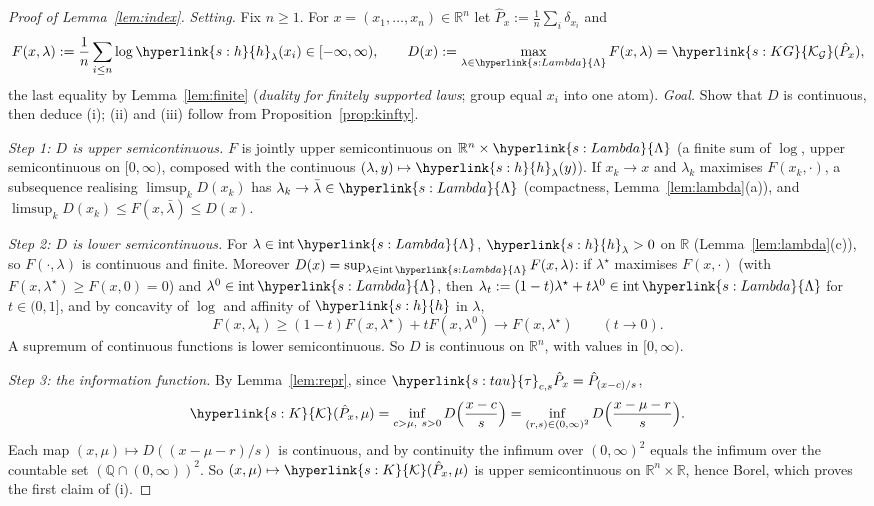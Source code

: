 \documentclass[11pt]{article}
\newcommand{\R}{\mathbb{R}}
\newcommand{\sy}[2]{{\hyperlink{#1}{#2}}}
\newcommand{\Kc}{\sy{s:K}{\mathcal{K}}}
\newcommand{\KG}{\sy{s:KG}{\mathcal{K}_{\mathcal{G}}}}
\newcommand{\tauc}{\sy{s:tau}{\tau}}
\newcommand{\hl}{\sy{s:h}{h}}
\newcommand{\Lam}{\sy{s:Lambda}{\Lambda}}
\begin{document}
\begin{proof}[Proof of Lemma~\ref{lem:index}]
\emph{Setting.} Fix $n\ge1$. For $x=(x_1,\dots,x_n)\in\R^n$ let $\hat P_x:=\frac1n\sum_i\delta_{x_i}$ and
\begin{equation*}
  F(x,\lambda):=\frac1n\sum_{i\le n}\log\hl_\lambda(x_i)\in[-\infty,\infty),\qquad D(x):=\max_{\lambda\in\Lam}F(x,\lambda)=\KG(\hat P_x),
\end{equation*}
the last equality by Lemma~\ref{lem:finite} (\emph{duality for finitely supported laws}; group equal $x_i$ into one atom). \emph{Goal.} Show that $D$ is
continuous, then deduce (i); (ii) and (iii) follow from Proposition~\ref{prop:kinfty}.

\emph{Step 1: $D$ is upper semicontinuous.} $F$ is jointly upper semicontinuous on $\R^n\times\Lam$ (a finite sum
of $\log$, upper semicontinuous on $[0,\infty)$, composed with the continuous $(\lambda,y)\mapsto\hl_\lambda(y)$). If $x_k\to x$
and $\lambda_k$ maximises $F(x_k,\cdot)$, a subsequence realising $\limsup_kD(x_k)$ has $\lambda_k\to\bar\lambda\in\Lam$ (compactness,
Lemma~\ref{lem:lambda}(a)), and $\limsup_kD(x_k)\le F(x,\bar\lambda)\le D(x)$.

\emph{Step 2: $D$ is lower semicontinuous.} For $\lambda\in\mathrm{int}\,\Lam$, $\hl_\lambda>0$ on $\R$ (Lemma~\ref{lem:lambda}(c)), so
$F(\cdot,\lambda)$ is continuous and finite. Moreover $D(x)=\sup_{\lambda\in\mathrm{int}\,\Lam}F(x,\lambda)$: if $\lambda^\star$ maximises $F(x,\cdot)$
(with $F(x,\lambda^\star)\ge F(x,0)=0$) and $\lambda^0\in\mathrm{int}\,\Lam$, then $\lambda_t:=(1-t)\lambda^\star+t\lambda^0\in\mathrm{int}\,\Lam$ for
$t\in(0,1]$, and by concavity of $\log$ and affinity of $\hl$ in $\lambda$,
\begin{equation*}
  F(x,\lambda_t)\ge(1-t)F(x,\lambda^\star)+tF(x,\lambda^0)\longrightarrow F(x,\lambda^\star)\qquad(t\to0).
\end{equation*}
A supremum of continuous functions is lower semicontinuous. So $D$ is continuous on $\R^n$, with values in
$[0,\infty)$.

\emph{Step 3: the information function.} By Lemma~\ref{lem:repr}, since $\tauc_{c,s}\hat P_x=\hat P_{(x-c)/s}$,
\begin{equation*}
  \Kc(\hat P_x,\mu)=\inf_{c>\mu,\ s>0}D\Bigl(\frac{x-c}{s}\Bigr)=\inf_{(r,s)\in(0,\infty)^2}D\Bigl(\frac{x-\mu-r}{s}\Bigr).
\end{equation*}
Each map $(x,\mu)\mapsto D((x-\mu-r)/s)$ is continuous, and by continuity the infimum over $(0,\infty)^2$ equals the
infimum over the countable set $(\mathbb Q\cap(0,\infty))^2$. So $(x,\mu)\mapsto\Kc(\hat P_x,\mu)$ is upper semicontinuous on
$\R^n\times\R$, hence Borel, which proves the first claim of (i).


\end{proof}
\end{document}
